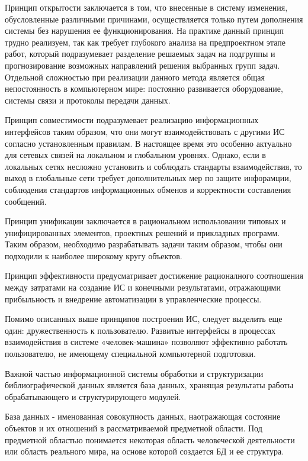 Принцип открытости заключается в том, что внесенные в систему изменения, обусловленные различными причинами, осуществляется только путем дополнения системы без нарушения ее функционирования. На практике данный принцип трудно реализуем, так как требует глубокого анализа на предпроектном этапе работ, который подразумевает разделение решаемых задач на подгруппы и прогнозирование возможных направлений решения выбранных групп задач. Отдельной сложностью при реализации данного метода является общая непостоянность в компьютерном мире: постоянно развивается оборудование, системы связи и протоколы передачи данных.

Принцип совместимости подразумевает реализацию информационных интерфейсов таким образом, что они могут взаимодействовать с другими ИС согласно установленным правилам. В настоящее время это особенно актуально для сетевых связей на локальном и глобальном уровнях. Однако, если в локальных сетях несложно установить и соблюдать стандарты взаимодействия, то выход в глобальные сети требует дополнительных мер по защите инфорамции, соблюдения стандартов информационных обменов и корректности составления сообщений.

Принцип унификации заключается в рациональном использовании типовых и унифицированных элементов, проектных решений и прикладных программ. Таким образом, необходимо разрабатывать задачи таким образом, чтобы они подходили к наиболее широкому кругу объектов. 

Принцип эффективности предусматривает достижение рационалного соотношения между затратами на создание ИС и конечными результатами, отражающими прибыльность и внедрение автоматизации в управленческие процессы.

Помимо описанных выше принципов построения ИС, следует выделить еще один: дружественность к пользователю. Развитые интерфейсы в процессах взаимодействия в системе «человек-машина» позволяют эффективно работать пользователю, не имеющему специальной компьютерной подготовки.

Важной частью информационной системы обработки и структуризации библиографической данных является база данных, хранящая результаты работы обрабатывающего и структурирующего модулей.

База данных - именованная совокупность данных, наотражающая состояние объектов и их отношений в рассматриваемой предметной области. Под предметной областью понимается некоторая область человеческой деятельности или область реального мира, на основе которой создается БД и ее структура.

